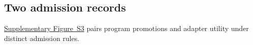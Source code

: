 \subsection{Two admission records}\label{app:recent-discovery-retention}

\href{eurekazero_supplement.pdf#supp-recent-discovery-retention}{Supplementary Figure~S3} pairs program
promotions and adapter utility under distinct admission rules.

